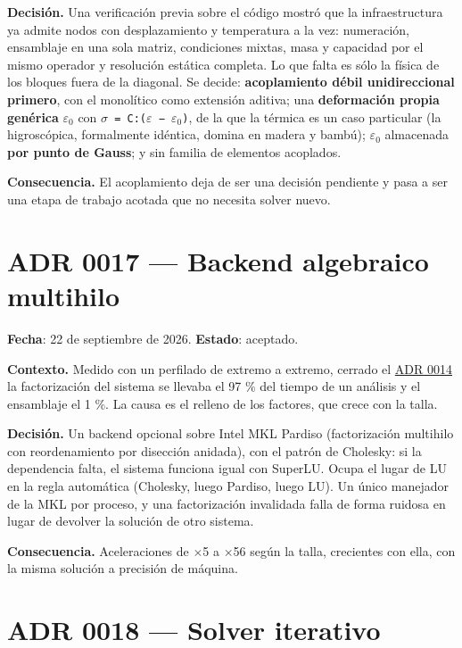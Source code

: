 \documentclass[11pt,oneside]{report}
\begin{document}
\textbf{Decisión.} Una verificación previa sobre el código mostró que la infraestructura ya admite nodos con desplazamiento y temperatura a la vez: numeración, ensamblaje en una sola matriz, condiciones mixtas, masa y capacidad por el mismo operador y resolución estática completa. Lo que falta es sólo la física de los bloques fuera de la diagonal. Se decide: \textbf{acoplamiento débil unidireccional primero}, con el monolítico como extensión aditiva; una \textbf{deformación propia genérica} \texttt{\ensuremath{\varepsilon}\ensuremath{_{0}}} con \texttt{\ensuremath{\sigma} = C:(\ensuremath{\varepsilon} − \ensuremath{\varepsilon}\ensuremath{_{0}})}, de la que la térmica es un caso particular (la higroscópica, formalmente idéntica, domina en madera y bambú); \texttt{\ensuremath{\varepsilon}\ensuremath{_{0}}} almacenada \textbf{por punto de Gauss}; y sin familia de elementos acoplados.

\textbf{Consecuencia.} El acoplamiento deja de ser una decisión pendiente y pasa a ser una etapa de trabajo acotada que no necesita solver nuevo.

\section{ADR 0017 --- Backend algebraico multihilo}
\label{adr:0017}

\textbf{Fecha}: 22 de septiembre de 2026. \textbf{Estado}: aceptado.

\textbf{Contexto.} Medido con un perfilado de extremo a extremo, cerrado el \hyperref[adr:0014]{ADR 0014} la factorización del sistema se llevaba el 97 \% del tiempo de un análisis y el ensamblaje el 1 \%. La causa es el relleno de los factores, que crece con la talla.

\textbf{Decisión.} Un backend opcional sobre Intel MKL Pardiso (factorización multihilo con reordenamiento por disección anidada), con el patrón de Cholesky: si la dependencia falta, el sistema funciona igual con SuperLU. Ocupa el lugar de LU en la regla automática (Cholesky, luego Pardiso, luego LU). Un único manejador de la MKL por proceso, y una factorización invalidada falla de forma ruidosa en lugar de devolver la solución de otro sistema.

\textbf{Consecuencia.} Aceleraciones de \ensuremath{\times}5 a \ensuremath{\times}56 según la talla, crecientes con ella, con la misma solución a precisión de máquina.

\section{ADR 0018 --- Solver iterativo}
\label{adr:0018}
\end{document}
